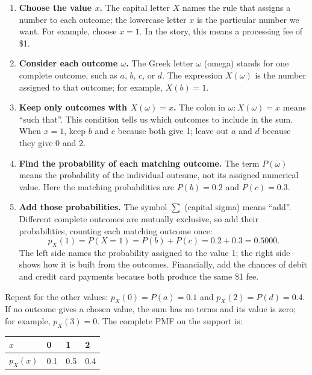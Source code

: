 \begin{enumerate}
\item \textbf{Choose the value $x$.} The capital letter $X$ names the rule that assigns a number to each outcome; the lowercase letter $x$ is the particular number we want. For example, choose $x=1$. In the story, this means a processing fee of \$1.
\item \textbf{Consider each outcome $\omega$.} The Greek letter $\omega$ (omega) stands for one complete outcome, such as $a$, $b$, $c$, or $d$. The expression $X(\omega)$ is the number assigned to that outcome; for example, $X(b)=1$.
\item \textbf{Keep only outcomes with $X(\omega)=x$.} The colon in $\omega:X(\omega)=x$ means ``such that''. This condition tells us which outcomes to include in the sum. When $x=1$, keep $b$ and $c$ because both give 1; leave out $a$ and $d$ because they give 0 and 2.
\item \textbf{Find the probability of each matching outcome.} The term $P(\omega)$ means the probability of the individual outcome, not its assigned numerical value. Here the matching probabilities are $P(b)=0.2$ and $P(c)=0.3$.
\item \textbf{Add those probabilities.} The symbol $\sum$ (capital sigma) means ``add''. Different complete outcomes are mutually exclusive, so add their probabilities, counting each matching outcome once:
\[
p_X(1)=P(X=1)=P(b)+P(c)=0.2+0.3=0.5000.
\]
The left side names the probability assigned to the value 1; the right side shows how it is built from the outcomes. Financially, add the chances of debit and credit card payments because both produce the same \$1 fee.
\end{enumerate}
Repeat for the other values: $p_X(0)=P(a)=0.1$ and $p_X(2)=P(d)=0.4$. If no outcome gives a chosen value, the sum has no terms and its value is zero; for example, $p_X(3)=0$. The complete PMF on the support is:
\begin{center}
\begin{tabular}{llll}
\toprule
$x$ & 0 & 1 & 2 \\ \midrule
$p_X(x)$ & 0.1 & 0.5 & 0.4 \\
\bottomrule
\end{tabular}
\end{center}

